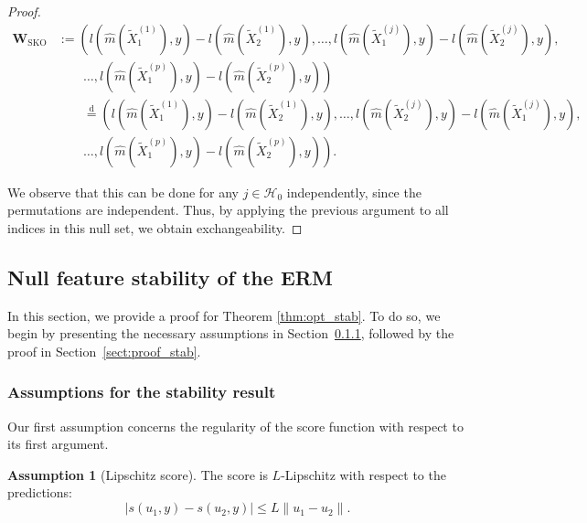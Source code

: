 \documentclass{article}
\theoremstyle{plain}
\theoremstyle{definition}
\newtheorem{assumption}[theorem]{Assumption}
\theoremstyle{remark}
\begin{document}
\begin{proof}
 \begin{align*}
     \mathbf{W}_\mathrm{SKO}&:=\left(l\left(\widehat{m}\left(\widetilde{X}^{(1)}_1 \right), y\right)-l\left(\widehat{m}\left(\widetilde{X}^{(1)}_2 \right), y\right), \ldots, l\left(\widehat{m}\left(\widetilde{X}^{(j)}_1 \right), y\right)-l\left(\widehat{m}\left(\widetilde{X}^{(j)}_2 \right), y\right),\right.
     \\ &\left.\qquad \ldots, l\left(\widehat{m}\left(\widetilde{X}^{(p)}_1 \right), y\right)-l\left(\widehat{m}\left(\widetilde{X}^{(p)}_2 \right), y\right)\right)\\
     &\qquad\overset{\mathrm{d}}{=}\left(l\left(\widehat{m}\left(\widetilde{X}^{(1)}_1 \right), y\right)-l\left(\widehat{m}\left(\widetilde{X}^{(1)}_2 \right), y\right), \ldots, l\left(\widehat{m}\left(\widetilde{X}^{(j)}_2 \right), y\right)-l\left(\widehat{m}\left(\widetilde{X}^{(j)}_1 \right), y\right),\right.
     \\ &\left.\qquad \ldots, l\left(\widehat{m}\left(\widetilde{X}^{(p)}_1 \right), y\right)-l\left(\widehat{m}\left(\widetilde{X}^{(p)}_2 \right), y\right)\right).
 \end{align*}
 
 
  We observe that this can be done for any $j \in \mathcal{H}_0$ independently, since the permutations are independent. Thus, by applying the previous argument to all indices in this null set, we obtain exchangeability.
  
\end{proof}


\subsection{Null feature stability of the ERM}

In this section, we provide a proof for Theorem \ref{thm:opt_stab}. To do so, we begin by presenting the necessary assumptions in Section~\ref{sect:assump_stab}, followed by the proof in Section~\ref{sect:proof_stab}.


\subsubsection{Assumptions for the stability result}\label{sect:assump_stab}


Our first assumption concerns the regularity of the score function with respect to its first argument.

 \begin{assumption}[Lipschitz score]\label{ass:score_lipsch}
 The score is $L$-Lipschitz with respect to the predictions: 
 $$|s(u_1, y)-s(u_2, y)|\leq L\|u_1-u_2\|.$$
 \end{assumption}
 
\end{document}
